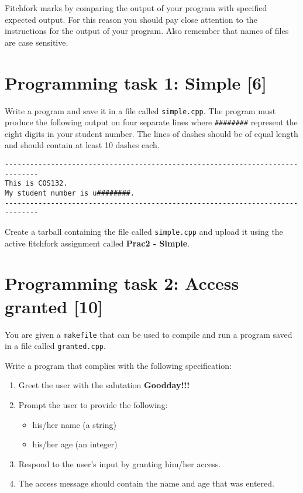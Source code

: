 \documentclass [a4paper,leqno, 12pt] {article}
\begin{document}
Fitchfork marks by comparing the output of your program with specified expected output. For this reason you should pay close attention to the instructions for the output of your program. Also remember that names of files are case sensitive.

\section{Programming task 1: Simple [6]}
Write a program and save it in a file called \texttt{simple.cpp}. The program must produce the following output on four separate lines where \verb|########| represent the eight digits in your student number. The lines of dashes should be of equal length and should contain at least 10 dashes each.
\begin{lstlisting}
------------------------------------------------------------------------------
This is COS132.
My student number is u########.
------------------------------------------------------------------------------
\end{lstlisting}

Create a tarball containing the file called \texttt{simple.cpp} and upload it using the active fitchfork assignment called \textbf{Prac2 - Simple}.

\section{Programming task 2: Access granted [10]}

You are given a \texttt{makefile} that can be used to compile and run a program saved in a file called \texttt{granted.cpp}.

Write a program that complies with the following specification:
\begin{enumerate}
\item Greet the user with the salutation \textbf{Goodday!!!}
\item Prompt the user to provide the following: 
\begin{itemize}
\item his/her name (a string)
\item his/her age (an integer) 
\end{itemize}
\item Respond to the user's input by granting him/her access. 
\item The access message should contain the name and age that was entered.
\end{enumerate}
\end{document}
